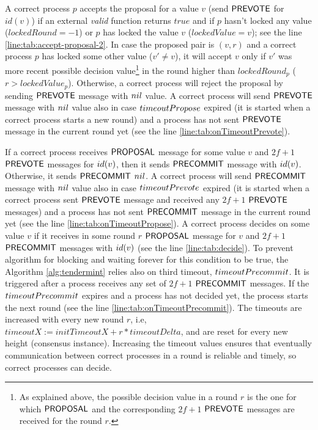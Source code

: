 A correct process $p$ accepts the proposal for a value $v$  (send $\mathsf{PREVOTE}$ for $id(v)$) if an external \emph{valid} function returns $true$
and if $p$ hasn't locked any value ($lockedRound = -1$) or $p$ has locked the value $v$ ($lockedValue = v$); see the line \ref{line:tab:accept-proposal-2}. 
In case the proposed pair is $(v,r)$ and a correct process $p$ has locked some other value ($v' \neq v$), it will accept $v$ only if $v'$ was more recent possible decision value\footnote{As explained above, the possible decision value in a round $r$ is the one for which $\mathsf{PROPOSAL}$ and the corresponding $2f+1$ $\mathsf{PREVOTE}$ messages are received for the round $r$.} in the round higher than $lockedRound_p$ ($r > lockedValue_p$).   
Otherwise, a correct process will reject the proposal by sending $\mathsf{PREVOTE}$ message with $nil$ value. A correct process will send $\mathsf{PREVOTE}$ message with $nil$ value also in case $timeoutPropose$ expired (it is started when a correct process starts a new round) and a process has not sent $\mathsf{PREVOTE}$ message in the current round yet (see the line \ref{line:tab:onTimeoutPrevote}). 

If a correct process receives $\mathsf{PROPOSAL}$ message for some value $v$ and $2f+1$ $\mathsf{PREVOTE}$
messages for $id(v)$, then it sends $\mathsf{PRECOMMIT}$ message with $id(v)$. Otherwise, it sends $\mathsf{PRECOMMIT}$ $nil$. A correct process will send $\mathsf{PRECOMMIT}$ message with $nil$ value also in case $timeoutPrevote$ expired (it is started when a correct process sent $\mathsf{PREVOTE}$ message and received any $2f+1$ $\mathsf{PREVOTE}$ messages)  and a process has not sent $\mathsf{PRECOMMIT}$ message in the current round yet (see the line \ref{line:tab:onTimeoutPropose}). 
A correct process decides on some value $v$ if it receives in some round $r$ $\mathsf{PROPOSAL}$ message for $v$ and $2f+1$ $\mathsf{PRECOMMIT}$ messages with $id(v)$ (see the line \ref{line:tab:decide}).  
To prevent algorithm for blocking and waiting forever for this condition to be true, the Algorithm \ref{alg:tendermint} relies also on third timeout, $timeoutPrecommit$. It is triggered after a process receives any set of $2f+1$ $\mathsf{PRECOMMIT}$ messages. If the $timeoutPrecommit$ expires and a process has not decided yet, the process starts the next round (see the line \ref{line:tab:onTimeoutPrecommit}).  
The timeouts are increased with every new round $r$, i.e, $timeoutX := initTimeoutX + r*timeoutDelta$, and are reset for every new height (consensus instance). Increasing the timeout values ensures that eventually communication between correct processes in a round is reliable and timely, so correct processes can decide. 
 

